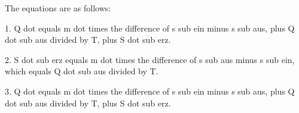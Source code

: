 The equations are as follows:

1. Q dot equals m dot times the difference of s sub ein minus s sub aus, plus Q dot sub aus divided by T, plus S dot sub erz.

2. S dot sub erz equals m dot times the difference of s sub aus minus s sub ein, which equals Q dot sub aus divided by T.

3. Q dot equals m dot times the difference of s sub ein minus s sub aus, plus Q dot sub aus divided by T, plus S dot sub erz.